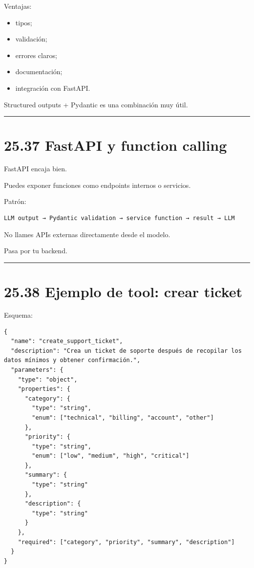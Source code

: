 Ventajas:

\begin{itemize}
\tightlist
\item
  tipos;
\item
  validación;
\item
  errores claros;
\item
  documentación;
\item
  integración con FastAPI.
\end{itemize}

Structured outputs + Pydantic es una combinación muy útil.

\begin{center}\rule{0.5\linewidth}{0.5pt}\end{center}

\section{25.37 FastAPI y function
calling}\label{fastapi-y-function-calling}

FastAPI encaja bien.

Puedes exponer funciones como endpoints internos o servicios.

Patrón:

\begin{lstlisting}
LLM output → Pydantic validation → service function → result → LLM
\end{lstlisting}

No llames APIs externas directamente desde el modelo.

Pasa por tu backend.

\begin{center}\rule{0.5\linewidth}{0.5pt}\end{center}

\section{25.38 Ejemplo de tool: crear
ticket}\label{ejemplo-de-tool-crear-ticket}

Esquema:

\begin{lstlisting}
{
  "name": "create_support_ticket",
  "description": "Crea un ticket de soporte después de recopilar los datos mínimos y obtener confirmación.",
  "parameters": {
    "type": "object",
    "properties": {
      "category": {
        "type": "string",
        "enum": ["technical", "billing", "account", "other"]
      },
      "priority": {
        "type": "string",
        "enum": ["low", "medium", "high", "critical"]
      },
      "summary": {
        "type": "string"
      },
      "description": {
        "type": "string"
      }
    },
    "required": ["category", "priority", "summary", "description"]
  }
}
\end{lstlisting}

